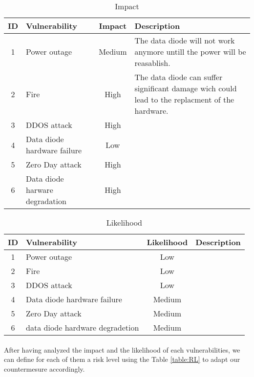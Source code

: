 \documentclass[a4paper,10pt]{article}
\begin{document}
\begin{table}[!h]
	\centering
	\begin{tabular}{|c|p{2.5cm}|c|p{10cm}|}
		\hline
		\textbf{ID}& \textbf{Vulnerability} &\textbf{Impact} & \textbf{Description}                 \\
		\hline
		1 & Power outage & Medium  &  The data diode will not work anymore untill the power will be reasablish. \\
		\hline
		2 & Fire & High  &  The data diode can suffer significant damage wich could lead to the replacment of the hardware.\\
		\hline
		3 & DDOS attack & High &\\
		\hline
		4 & Data diode hardware failure  & Low &\\
		\hline
		5 & Zero Day attack & High &\\
		\hline
		6 & Data diode harware degradation & High &\\
		\hline
	\end{tabular}
	\caption{Impact}
\end{table}

\begin{table}[!h]
	\centering
	\begin{tabular}{|c|p{}|c|p{10cm}|}
		\hline
		\textbf{ID}& \textbf{Vulnerability} & \textbf{Likelihood} & \textbf{Description}                 \\
		\hline
		1 & Power outage & Low &   \\
		\hline
		2 & Fire & Low  &  \\
		\hline
		3 & DDOS attack & Low & \\
		\hline
		4 & Data diode hardware failure  & Medium & \\
		\hline
		5 & Zero Day attack & Medium & \\
		\hline
		6 & data diode hardware degradetion & Medium & \\
		\hline
	\end{tabular}
	\caption{Likelihood}
\end{table}

\paragraph{} After having analyzed the impact and the likelihood of each vulnerabilities, we can define for each of them a risk level using the Table \ref{table:RL} to adapt our countermesure accordingly.
\end{document}

